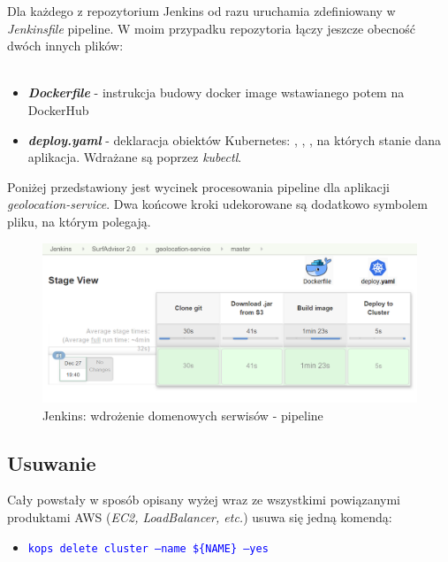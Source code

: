 Dla każdego z repozytorium Jenkins od razu uruchamia zdefiniowany w \emph{Jenkinsfile} pipeline.
W moim przypadku repozytoria łączy jeszcze obecność dwóch innych plików:
\\\\
\begin{itemize}
    \item
    \emph{\textbf{Dockerfile}} - instrukcja budowy docker image wstawianego potem na DockerHub
    \item
    \emph{\textbf{deploy.yaml}} - deklaracja obiektów Kubernetes: , , , na których stanie dana aplikacja.
    Wdrażane są poprzez \emph{kubectl}.
\end{itemize} 

Poniżej przedstawiony jest wycinek procesowania pipeline dla aplikacji \emph{geolocation-service}.
Dwa końcowe kroki udekorowane są dodatkowo symbolem pliku, na którym polegają.

\begin{figure}[!ht]
	\begin{center}
		\includegraphics[width=1\textwidth]{img/jenkins-geo-stages}
	\end{center}
	\caption{Jenkins: wdrożenie domenowych serwisów - pipeline}
\end{figure}

\subsection{Usuwanie}

Cały powstały w sposób opisany wyżej  wraz ze wszystkimi powiązanymi produktami AWS (\emph{EC2, LoadBalancer, etc.}) usuwa się jedną komendą:

\begin{itemize}
    \item
    \textcolor{blue}{\texttt{kops delete cluster --name \$\{NAME\} --yes}}
\end{itemize} 

